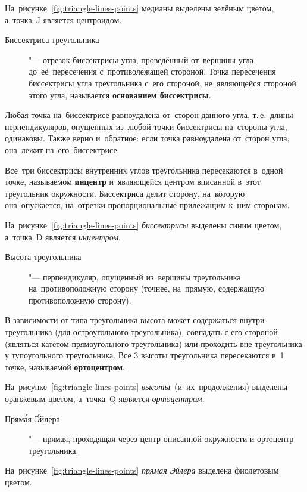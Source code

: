 \documentclass[]{scrartcl}
\begin{document}
На~рисунке~\ref{fig:triangle-lines-points} медианы выделены зелёным цветом, а~точка~J является центроидом.


\begin{description}
	\item[Биссектриса треугольника] "--- отрезок биссектрисы угла, проведённый от~вершины угла до~её~пересечения с~противолежащей стороной. Точка пересечения биссектрисы угла треугольника с~его стороной, не~являющейся стороной этого угла, называется \textbf{основанием биссектрисы}.
\end{description}

Любая точка на~биссектрисе равноудалена от~сторон данного угла, т.\,е.~длины перпендикуляров, опущенных из~любой точки биссектрисы на~стороны угла, одинаковы. Также верно и~обратное: если точка равноудалена от~сторон угла, она~лежит на~его~биссектрисе.

Все~три биссектрисы внутренних углов треугольника пересекаются в~одной точке, называемом \textbf{инцентр} и~являющейся центром вписанной в~этот треугольник окружности. Биссектриса делит сторону, на~которую она~опускается, на~отрезки пропорциональные прилежащим к~ним сторонам.

На~рисунке~\ref{fig:triangle-lines-points} \emph{биссектрисы} выделены синим цветом, а~точка~D является \emph{инцентром}.

\begin{description}
	\item[Высота треугольника] "--- перпендикуляр, опущенный из~вершины треугольника на~противоположную сторону (точнее, на~прямую, содержащую противоположную сторону).
\end{description}
В зависимости от типа треугольника высота может содержаться внутри треугольника (для остроугольного треугольника), совпадать с его стороной (являться катетом прямоугольного треугольника) или проходить вне треугольника у тупоугольного треугольника. Все 3 высоты треугольника пересекаются в~1 точке, называемой \textbf{ортоцентром}.

На~рисунке~\ref{fig:triangle-lines-points} \emph{высоты}~(и~их~продолжения) выделены оранжевым цветом, а~точка~Q является \emph{ортоцентром}.

\begin{description}
	\item[Пряма́я Э́йлера] "--- прямая, проходящая через центр описанной окружности и ортоцентр треугольника.
\end{description}

На~рисунке~\ref{fig:triangle-lines-points} \emph{прямая Эйлера}  выделена фиолетовым цветом.
\end{document}
